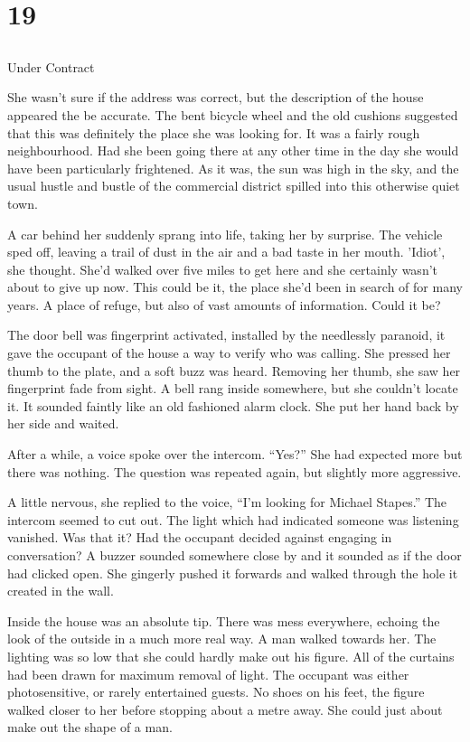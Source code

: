 \chapter{19}
\section{}
Under Contract  

She wasn't sure if the address was correct, but the description of the house appeared the be accurate.  The bent bicycle wheel and the old cushions suggested that this was definitely the place she was looking for.  It was a fairly rough neighbourhood.  Had she been going there at any other time in the day she would have been particularly frightened.  As it was, the sun was high in the sky, and the usual hustle and bustle of the commercial district spilled into this otherwise quiet town.  

A car behind her suddenly sprang into life, taking her by surprise.  The vehicle sped off, leaving a trail of dust in the air and a bad taste in her mouth.  'Idiot', she thought.  She'd walked over five miles to get here and she certainly wasn't about to give up now.  This could be it, the place she'd been in search of for many years.  A place of refuge, but also of vast amounts of information.  Could it be?

The door bell was fingerprint activated, installed by the needlessly paranoid, it gave the occupant of the house a way to verify who was calling.  She pressed her thumb to the plate, and a soft buzz was heard.  Removing her thumb, she saw her fingerprint fade from sight.  A bell rang inside somewhere, but she couldn't locate it.  It sounded faintly like an old fashioned alarm clock.  She put her hand back by her side and waited.

After a while, a voice spoke over the intercom.  ``Yes?''  She had expected more but there was nothing.  The question was repeated again, but slightly more aggressive.  

A little nervous, she replied to the voice, ``I'm looking for Michael Stapes.''  The intercom seemed to cut out.  The light which had indicated someone was listening vanished.  Was that it?  Had the occupant decided against engaging in conversation?  A buzzer sounded somewhere close by and it sounded as if the door had clicked open.  She gingerly pushed it forwards and walked through the hole it created in the wall.

Inside the house was an absolute tip.  There was mess everywhere, echoing the look of the outside in a much more real way.  A man walked towards her.  The lighting was so low that she could hardly make out his figure.  All of the curtains had been drawn for maximum removal of light.  The occupant was either photosensitive, or rarely entertained guests.  No shoes on his feet, the figure walked closer to her before stopping about a metre away.  She could just about make out the shape of a man.

